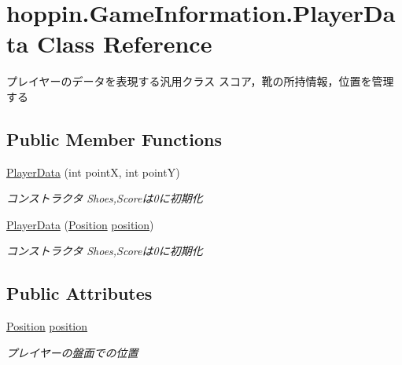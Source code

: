 \hypertarget{classhoppin_1_1_game_information_1_1_player_data}{}\section{hoppin.\+Game\+Information.\+Player\+Data Class Reference}
\label{classhoppin_1_1_game_information_1_1_player_data}


プレイヤーのデータを表現する汎用クラス スコア，靴の所持情報，位置を管理する  


\subsection*{Public Member Functions}
\begin{DoxyCompactItemize}
\item 
\hyperlink{classhoppin_1_1_game_information_1_1_player_data_af2c0af889a9a374f96fcc94b79808ea3}{Player\+Data} (int pointX, int pointY)
\begin{DoxyCompactList}\small\item\em コンストラクタ Shoes,Scoreは0に初期化 \end{DoxyCompactList}\item 
\hyperlink{classhoppin_1_1_game_information_1_1_player_data_ab30b6bb6dd6cb85d155458dc508a2a06}{Player\+Data} (\hyperlink{classhoppin_1_1_game_information_1_1_position}{Position} \hyperlink{classhoppin_1_1_game_information_1_1_player_data_ad71d71a9669fea5ca4ec43c1efc53167}{position})
\begin{DoxyCompactList}\small\item\em コンストラクタ Shoes,Scoreは0に初期化 \end{DoxyCompactList}\end{DoxyCompactItemize}
\subsection*{Public Attributes}
\begin{DoxyCompactItemize}
\item 
\hyperlink{classhoppin_1_1_game_information_1_1_position}{Position} \hyperlink{classhoppin_1_1_game_information_1_1_player_data_ad71d71a9669fea5ca4ec43c1efc53167}{position}
\begin{DoxyCompactList}\small\item\em プレイヤーの盤面での位置 \end{DoxyCompactList}\end{DoxyCompactItemize}
